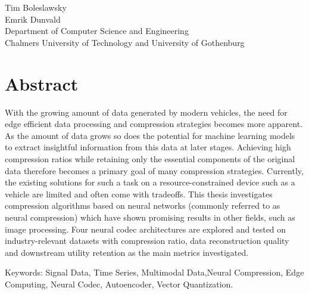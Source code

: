 \oneLineTitle\\
\oneLineSubtitle\\
Tim Boleslawsky\\
Emrik Dunvald\\
Department of Computer Science and Engineering\\
Chalmers University of Technology and University of Gothenburg

\thispagestyle{plain}			%
\section*{Abstract}
With the growing amount of data generated by modern vehicles, the need for edge efficient data processing and compression strategies becomes more apparent. As the amount of data grows so does the potential for machine learning models to extract insightful information from this data at later stages. Achieving high compression ratios while retaining only the essential components of the original data therefore becomes a primary goal of many compression strategies. Currently, the existing solutions for such a task on a resource-constrained device such as a vehicle are limited and often come with tradeoffs. This thesis investigates compression algorithms based on neural networks (commonly referred to as neural compression) which have shown promising results in other fields, such as image processing. Four neural codec architectures are explored and tested on industry-relevant datasets with compression ratio, data reconstruction quality and downstream utility retention as the main metrics investigated.

\vfill
Keywords: Signal Data, Time Series, Multimodal Data,Neural Compression, Edge Computing, Neural Codec, Autoencoder, Vector Quantization.

\newpage				%
\thispagestyle{empty}
\mbox{}